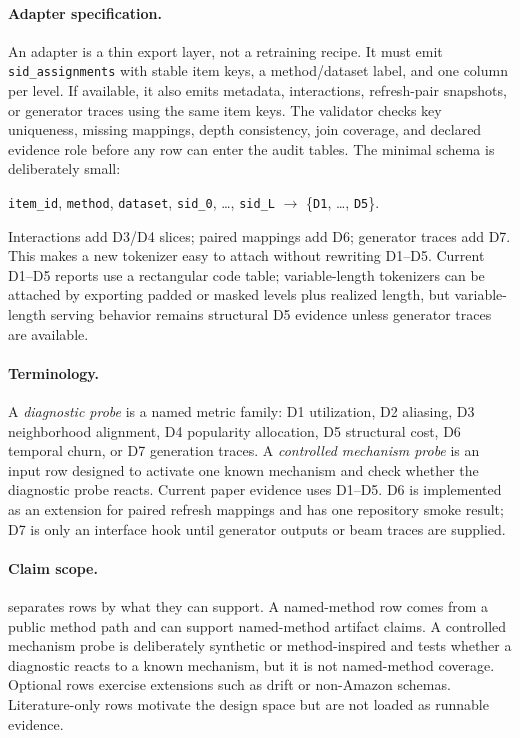 \paragraph{Adapter specification.}
An adapter is a thin export layer, not a retraining recipe. It must emit
\texttt{sid\_assignments} with stable item keys, a method/dataset label, and
one column per \sid level. If available, it also emits metadata, interactions,
refresh-pair snapshots, or generator traces using the same item keys. The
validator checks key uniqueness, missing mappings, depth consistency, join
coverage, and declared evidence role before any row can enter the audit tables.
The minimal schema is deliberately small:
\begin{center}
\small
\texttt{item\_id}, \texttt{method}, \texttt{dataset}, \texttt{sid\_0}, \ldots,
\texttt{sid\_L} $\rightarrow$ \{\texttt{D1}, \ldots, \texttt{D5}\}.
\end{center}
Interactions add D3/D4 slices; paired mappings add D6; generator traces add
D7. This makes a new tokenizer easy to attach without rewriting D1--D5.
Current D1--D5 reports use a rectangular code table; variable-length tokenizers
can be attached by exporting padded or masked levels plus realized length, but
variable-length serving behavior remains structural D5 evidence unless
generator traces are available.

\paragraph{Terminology.}
A \emph{diagnostic probe} is a named metric family: D1 utilization, D2
aliasing, D3 neighborhood alignment, D4 popularity allocation, D5 structural
cost, D6 temporal churn, or D7 generation traces. A \emph{controlled mechanism
probe} is an input row designed to activate one known mechanism and check
whether the diagnostic probe reacts. Current paper evidence uses D1--D5. D6 is
implemented as an extension for paired refresh mappings and has one repository
smoke result; D7 is only an interface hook until generator outputs or beam
traces are supplied.

\paragraph{Claim scope.}
\tool separates rows by what they can support. A named-method row comes from a
public method path and can support named-method artifact claims. A controlled
mechanism probe is deliberately synthetic or method-inspired and tests whether
a diagnostic reacts to a known mechanism, but it is not named-method coverage.
Optional rows exercise extensions such as drift or non-Amazon schemas.
Literature-only rows motivate the design space but are not loaded as runnable
evidence.

